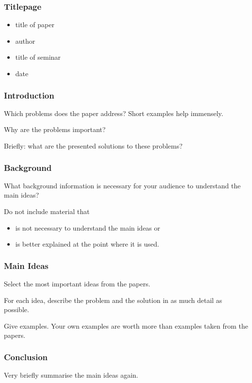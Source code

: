 \begin{frame}
  \frametitle{Titlepage}

  \begin{itemize}
    \item title of paper
    \item author
    \item title of seminar
    \item date
  \end{itemize}
\end{frame}

\begin{frame}
  \frametitle{Introduction}

  Which problems does the paper address? Short examples help immensely.

  \medskip
  \pause

  Why are the problems important?

  \medskip
  \pause

  Briefly: what are the presented solutions to these problems?
\end{frame}

\begin{frame}
  \frametitle{Background}

  What background information is necessary for your audience to understand the main ideas?

  \medskip
  \pause

  Do not include material that
  \begin{itemize}
    \item is not necessary to understand the main ideas or
    \item is better explained at the point where it is used.
  \end{itemize}
\end{frame}

\begin{frame}
  \frametitle{Main Ideas}

  Select the most important ideas from the papers.

  \medskip
  \pause

  For each idea, describe the problem and the solution in as much detail as possible.

  \medskip
  \pause

  Give examples. Your own examples are worth more than examples taken from the papers.
\end{frame}

\begin{frame}
  \frametitle{Conclusion}

  Very briefly summarise the main ideas again.
\end{frame}

